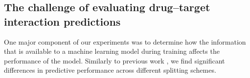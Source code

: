 \documentclass{bioinfo}
\renewcommand{\cite}{\citep}
\begin{document}













\subsection{The challenge of evaluating drug--target interaction
  predictions}

One major component of our experiments was to determine how the
information that is available to a machine learning model during
training affects the performance of the model. Similarly to previous
work \cite{MolTrans2020, DeepConvDTI2019}, we find significant
differences in predictive performance across different splitting
schemes.
\end{document}
